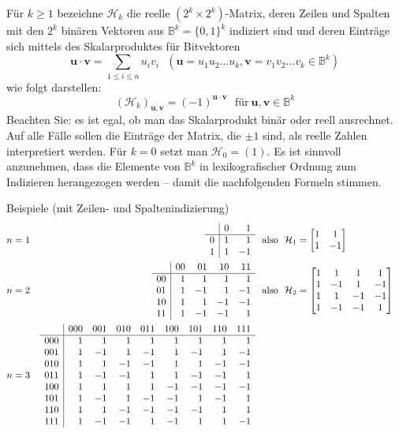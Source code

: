 Für $k \geq 1$ bezeichne $\mathcal{H}_k$ die reelle $(2^k \times 2^k)$-Matrix,
deren Zeilen und Spalten mit den $2^k$ binären Vektoren aus
$\mathbb{B}^k=\{0,1\}^k$ indiziert sind und deren Einträge sich mittels des
Skalarproduktes für Bitvektoren
\[
\mathbf{u}\cdot\mathbf{v}= \sum_{1 \leq i \leq n} u_i v_i
~~~(\mathbf{u}=u_1u_2\ldots u_k, \mathbf{v}=v_1v_2\ldots v_k \in \mathbb{B}^k)
\]
wie folgt darstellen:
\[
\left( \mathcal{H}_k\right)_{\mathbf{u},\mathbf{v}} =
(-1)^{\mathbf{u}\cdot \mathbf{v}}~~~\text{für}~
\mathbf{u},\mathbf{v} \in \mathbb {B}^k
\]
Beachten Sie: es ist egal, ob man das Skalarprodukt binär oder reell
ausrechnet. Auf alle Fälle sollen die Einträge der Matrix, die $\pm 1$ sind,
als reelle Zahlen interpretiert werden.
Für $k=0$ setzt man $\mathcal{H}_0 = (1)$. Es ist sinnvoll anzunehmen, dass die
Elemente von $\mathbb{B}^k$ in lexikografischer Ordnung zum Indizieren
herangezogen werden -- damit die nachfolgenden Formeln stimmen.

Beispiele (mit Zeilen- und Spaltenindizierung)
\begin{align*}
n=1&&
\begin{array}{c|rr}
   & 0 & 1 \\ \hline
0 & 1 & 1 \cr
1 & 1 & -1
\end{array}
&\text{~~also~~}
\mathcal{H}_1 = \begin{bmatrix} 1 & 1 \cr 1 & -1 \end{bmatrix}
\cr
n=2&&
\begin{array}{c|rrrr}
      & 00 & 01 & 10 & 11 \\ \hline
 00 & 1 & 1 & 1 & 1 \cr
 01 & 1 & -1 & 1 & -1 \cr
 10 & 1 & 1 & -1 & -1 \cr
 11 &  1 & -1 & -1 & 1 
 \end{array}
 &\text{~~also~~}
\mathcal{H}_2 =
\begin{bmatrix}
	1 & 1 & 1 & 1 \cr
	1 & -1 & 1 & -1\cr
	1 & 1 & -1 & -1 \cr
	1 & -1 & -1 & 1
\end{bmatrix}
\cr
n=3&&
\begin{array}{c|rrrrrrrr}
     & 000 & 001 & 010 & 011& 100 & 101 & 110 & 111 \\ \hline
 000 & 1 & 1  & 1  & 1  & 1 & 1  & 1  & 1 \cr
 001 & 1 & -1 & 1  & -1 &1  & -1 & 1  & -1 \cr
 010 & 1 & 1  & -1 & -1 & 1 & 1  & -1  & -1 \cr
 011 &  1 & -1 & -1 & 1 &  1 & -1 & -1 & 1 \cr
 100 & 1 & 1 & 1 & 1 & -1 & -1 & -1 & -1 \cr
 101 & 1 & -1 & 1 & -1 & -1 & 1 & -1 & 1 \cr
 110 & 1 & 1 & -1 & -1  & -1 & -1 & 1 & 1 \cr
 111 &  1 & -1 & -1 & 1 & -1 & 1 & 1 & -1
 \end{array}
 &
 \end{align*}

